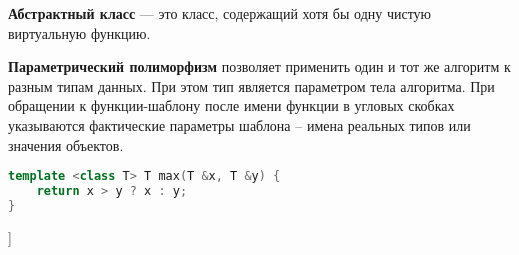 \textbf{Абстрактный класс} --- это класс, содержащий хотя бы одну чистую виртуальную функцию.

\textbf{Параметрический полиморфизм} позволяет применить один и тот же алгоритм к разным типам данных. При этом тип является параметром тела алгоритма. При обращении к функции-шаблону после имени функции в угловых скобках указываются фактические параметры шаблона -- имена реальных типов или значения объектов.
\begin{lstlisting}[language=C++]
template <class T> T max(T &x, T &y) {
    return x > y ? x : y; 
}
\end{lstlisting}

\bigbreak
[\cite[page 20-23]{gerbert}]